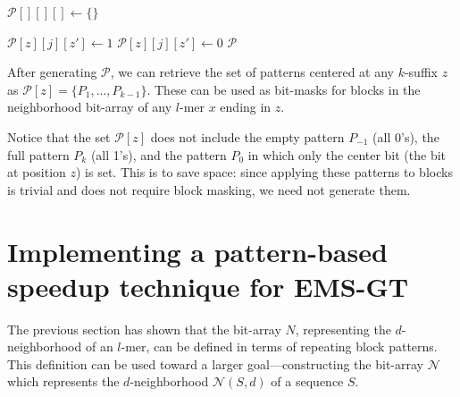 \documentclass[oneside,12pt]{DISCSthesis}
\begin{document}
{\begin{enumerate}
{\begin{algorithmic}[1]
				\State $\mathcal{P}[][][] \leftarrow \{\}$ \hspace*{90pt}

					\State $\mathcal{P}[z][j][z'] \leftarrow 1$
				\Else
					\State $\mathcal{P}[z][j][z'] \leftarrow 0$
				\EndIf\EndFor\EndFor\EndFor
				\State\Return $\mathcal{P}$
				\end{algorithmic}
			}
			\bigskip
			\noindent After generating $\mathcal{P}$, we can retrieve the set of patterns centered at any $k$-suffix $z$ as $\mathcal{P}[z] = \{P_{1},...,P_{k-1}\}$. These can be used as bit-masks for blocks in the neighborhood bit-array of any $l$-mer $x$ ending in $z$.

			Notice that the set $\mathcal{P}[z]$ does not include the empty pattern $P_{-1}$ (all 0's), the full pattern $P_{k}$ (all 1's), and the pattern $P_{0}$ in which only the center bit (the bit at position $z$) is set. This is to save space: since applying these patterns to blocks is trivial and does not require block masking, we need not generate them.

		\end{enumerate}

		\newpage
	


	\newpage
	\section{Implementing a pattern-based speedup technique for EMS-GT}
		The previous section has shown that the bit-array $N$, representing the $d$-neighborhood of an $l$-mer, can be defined in terms of repeating block patterns. This definition can be used toward a larger goal---constructing the bit-array $\mathcal{N}$ which represents the $d$-neighborhood $\mathcal{N}(S,d)$ of a sequence $S$.

}
\end{document}
